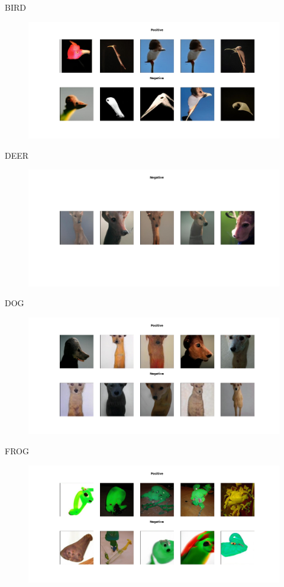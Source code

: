 \documentclass[12pt,a4paper,openany]{book}
\begin{document}
\newline
BIRD
\begin{figure}[ht!]
    \centering
    \includegraphics[scale=0.4]{figs/cifar10_examples/bird.png}
\end{figure}
\newpage
\noindent DEER
\begin{figure}[ht!]
    \centering
    \includegraphics[scale=0.4]{figs/cifar10_examples/deer.png}
\end{figure}
\newline
DOG
\begin{figure}[ht!]
    \centering
    \includegraphics[scale=0.4]{figs/cifar10_examples/dog.png}
\end{figure}
\newpage
\noindent FROG
\begin{figure}[ht!]
    \centering
    \includegraphics[scale=0.4]{figs/cifar10_examples/frog.png}
\end{figure}
\end{document}
